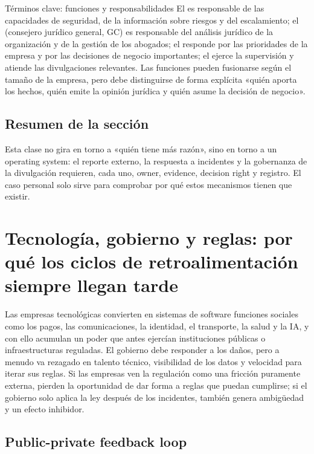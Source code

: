 \documentclass[a4paper]{article}
\begin{document}
\begin{knowledgebox}{Términos clave: funciones y responsabilidades}
El  es responsable de las capacidades de seguridad, de la información sobre riesgos y del escalamiento; el  (consejero jurídico general, GC) es responsable del análisis jurídico de la organización y de la gestión de los abogados; el  responde por las prioridades de la empresa y por las decisiones de negocio importantes; el  ejerce la supervisión y atiende las divulgaciones relevantes. Las funciones pueden fusionarse según el tamaño de la empresa, pero debe distinguirse de forma explícita «quién aporta los hechos, quién emite la opinión jurídica y quién asume la decisión de negocio».
\end{knowledgebox}

\subsection{Resumen de la sección}

Esta clase no gira en torno a «quién tiene más razón», sino en torno a un operating system: el reporte externo, la respuesta a incidentes y la gobernanza de la divulgación requieren, cada uno, owner, evidence, decision right y registro. El caso personal solo sirve para comprobar por qué estos mecanismos tienen que existir.
\section{Tecnología, gobierno y reglas: por qué los ciclos de retroalimentación siempre llegan tarde}

Las empresas tecnológicas convierten en sistemas de software funciones sociales como los pagos, las comunicaciones, la identidad, el transporte, la salud y la IA, y con ello acumulan un poder que antes ejercían instituciones públicas o infraestructuras reguladas. El gobierno debe responder a los daños, pero a menudo va rezagado en talento técnico, visibilidad de los datos y velocidad para iterar sus reglas. Si las empresas ven la regulación como una fricción puramente externa, pierden la oportunidad de dar forma a reglas que puedan cumplirse; si el gobierno solo aplica la ley después de los incidentes, también genera ambigüedad y un efecto inhibidor.

\subsection{Public-private feedback loop}
\end{document}
